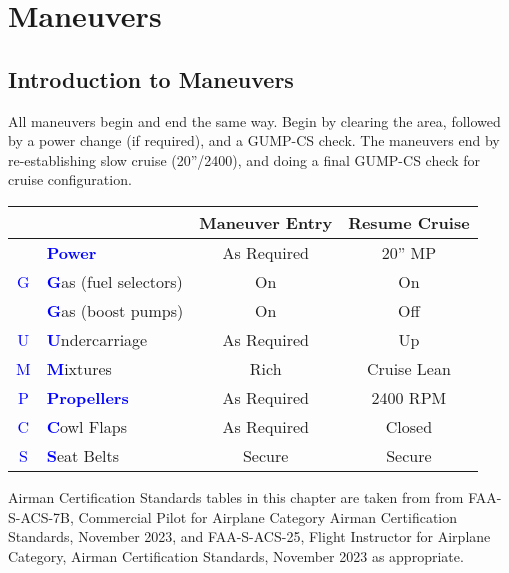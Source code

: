 
\chapter{Maneuvers}

\section{Introduction to Maneuvers}

All maneuvers begin and end the same way. Begin by clearing the area, followed by a power change (if required),
and a GUMP-CS check. The maneuvers end by re-establishing slow cruise (20''/2400), and doing a final GUMP-CS
check for cruise configuration.

\begin{table}[H]
\centering
\begin{tabular}{|c|l|c|c|}
\hline
                    &                                                 & \textbf{Maneuver Entry} & \textbf{Resume Cruise} \\ \hline
                    & \textcolor{blue}{\textbf{Power}}                & As Required             & 20'' MP                \\ \hline
\textcolor{blue}{G} & \textcolor{blue}{\textbf{G}}as (fuel selectors) & On                      & On                     \\
                    & \textcolor{blue}{\textbf{G}}as (boost pumps)    & On                      & Off                    \\ \hline
\textcolor{blue}{U} & \textcolor{blue}{\textbf{U}}ndercarriage        & As Required             & Up                     \\ \hline
\textcolor{blue}{M} & \textcolor{blue}{\textbf{M}}ixtures             & Rich                    & Cruise Lean            \\ \hline
\textcolor{blue}{P} & \textcolor{blue}{\textbf{Propellers}}           & As Required             & 2400 RPM               \\ \hline
\textcolor{blue}{C} & \textcolor{blue}{\textbf{C}}owl Flaps           & As Required             & Closed                 \\ \hline
\textcolor{blue}{S} & \textcolor{blue}{\textbf{S}}eat Belts           & Secure                  & Secure                 \\ \hline
\end{tabular}
\end{table}

Airman Certification Standards tables in this chapter are taken from from FAA-S-ACS-7B, Commercial Pilot for Airplane Category Airman Certification Standards, November 2023, and  FAA-S-ACS-25, Flight Instructor for Airplane Category, Airman Certification Standards, November 2023 as appropriate.

